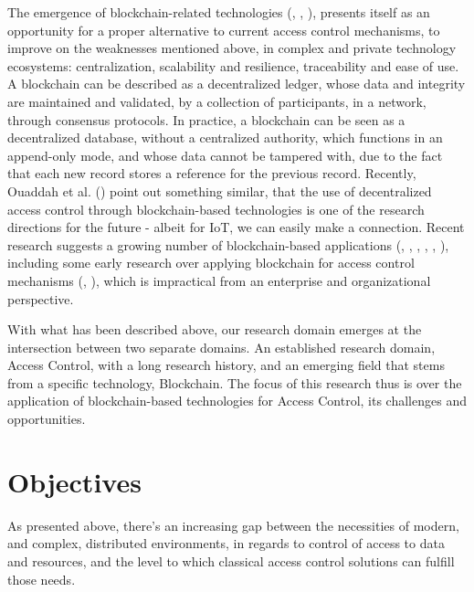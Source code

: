 The emergence of blockchain-related technologies (\cite{nakamoto_bitcoin:_2008}, \cite{buterin_next-generation_2013}, \cite{wood_ethereum:_2014}), presents itself as an opportunity for a proper alternative to current access control mechanisms, to improve on the weaknesses mentioned above, in complex and private technology ecosystems: centralization, scalability and resilience, traceability and ease of use. A blockchain can be described as a decentralized ledger, whose data and integrity are maintained and validated, by a collection of participants, in a network, through consensus protocols. In practice, a blockchain can be seen as a decentralized database, without a centralized authority, which functions in an append-only mode, and whose data cannot be tampered with, due to the fact that each new record stores a reference for the previous record. Recently, Ouaddah et al. (\cite{ouaddah_access_2017}) point out something similar, that the use of decentralized access control through blockchain-based technologies is one of the research directions for the future - albeit for IoT, we can easily make a connection. Recent research suggests a growing number of blockchain-based applications (\cite{pilkington_blockchain_2015}, \cite{yermack_corporate_2017}, \cite{xu_blockchain_2016}, \cite{dorri_blockchain_2016}, \cite{fotiou_decentralized_2016}, \cite{augot_identity_2017}), including some early research over applying blockchain for access control mechanisms (\cite{maesa_blockchain_2017}, \cite{maesa_distributed_2017}), which is impractical from an enterprise and organizational perspective. 

With what has been described above, our research domain emerges at the intersection between two separate domains. An established research domain, Access Control, with a long research history, and an emerging field that stems from a specific technology, Blockchain. The focus of this research thus is over the application of blockchain-based technologies for Access Control, its challenges and opportunities.

\section{Objectives}

As presented above, there's an increasing gap between the necessities of modern, and complex, distributed environments, in regards to control of access to data and resources, and the level to which classical access control solutions can fulfill those needs.

